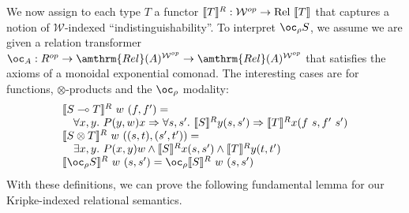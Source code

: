 We now assign to each type $T$ a functor
$\llbracket T \rrbracket^R : \mathcal{W}^{op} \to \mathrm{Rel}~\llbracket T \rrbracket$ that captures
a notion of $\mathcal{W}$-indexed ``indistinguishability''. To
interpret $\oc_\rho S$, we assume we are given a relation transformer
$\oc_A : R^{op} \to \amthrm{Rel}(A)^{\mathcal{W}^{op}} \to
\amthrm{Rel}(A)^{\mathcal{W}^{op}}$
that satisfies the axioms of a monoidal exponential comonad. The
interesting cases are for functions, $\otimes$-products and the
$\oc_\rho$ modality:
\begin{displaymath}
  \begin{array}{l}
    \llbracket \fun{S}{T} \rrbracket^R~w~(f,f') = \\
    \quad \forall x,y.~P(y,w)x \Rightarrow \forall s,s'.~\llbracket S \rrbracket^R y (s, s') \Rightarrow \llbracket
    T \rrbracket^R x (f~s, f'~s')
    \\
    \llbracket \tensor{S}{T} \rrbracket^R~w~((s, t), (s', t')) =\\
    \quad
    \exists x,y.~P(x,y)w \wedge \llbracket S \rrbracket^R x (s, s') \wedge
    \llbracket T \rrbracket^R y (t, t')
    \\
    \llbracket \excl{\rho}{S} \rrbracket^R~w~(s,s')=
    \oc_\rho \llbracket S \rrbracket^R~w~(s,s')\\
  \end{array}
\end{displaymath}
With these definitions, we can prove the following fundamental lemma
for our Kripke-indexed relational semantics.





